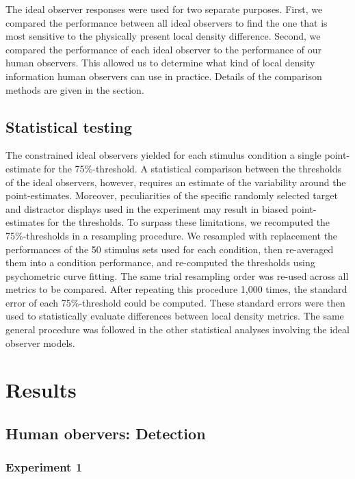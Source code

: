 \documentclass[12pt]{article}
\begin{document}
The ideal observer responses were used for two separate purposes. First, we compared the performance between all ideal observers to find the one that is most sensitive to the physically present local density difference. Second, we compared the performance of each ideal observer to the performance of our human observers. This allowed us to determine what kind of local density information human observers can use in practice. Details of the comparison methods are given in the  section.\\


\subsection{Statistical testing}\label{subsection_methods_stats}

The constrained ideal observers yielded for each stimulus condition a single point-estimate for the 75\%-threshold. A statistical comparison between the thresholds of the ideal observers, however, requires an estimate of the variability around the point-estimates. Moreover, peculiarities of the specific randomly selected target and distractor displays used in the experiment may result in biased point-estimates for the thresholds. To surpass these limitations, we recomputed the 75\%-thresholds in a resampling procedure. We resampled with replacement the performances of the 50 stimulus sets used for each condition, then re-averaged them into a condition performance, and re-computed the thresholds using psychometric curve fitting. The same trial resampling order was re-used across all metrics to be compared. After repeating this procedure 1,000 times, the standard error of each 75\%-threshold could be computed. These standard errors were then used to statistically evaluate differences between local density metrics. The same general procedure was followed in the other statistical analyses involving the ideal observer models.

\section{Results}\label{section_results}
\subsection{Human obervers: Detection}\label{subsection_results_detect_human}
\subsubsection{Experiment 1}
\end{document}
